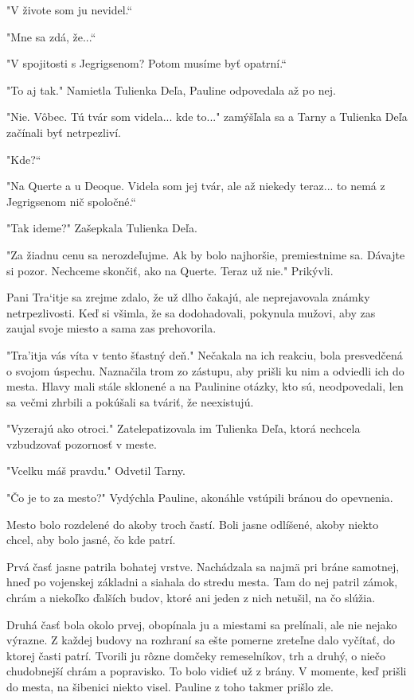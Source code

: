 \documentclass{book}
\begin{document}
"$ $V živote som ju nevidel.“

"$ $Mne sa zdá, že...“

"$ $V spojitosti s Jegrigsenom? Potom musíme byť opatrní.“

"$ $To aj tak."$ $ Namietla Tulienka Deľa, Pauline odpovedala až po nej.

"$ $Nie. Vôbec. Tú tvár som videla... kde to..."$ $ zamýšľala sa a Tarny a Tulienka Deľa začínali byť netrpezliví.

"$ $Kde?“

"$ $Na Querte a u Deoque. Videla som jej tvár, ale až niekedy teraz... to nemá z Jegrigsenom nič spoločné.“

"$ $Tak ideme?"$ $ Zašepkala Tulienka Deľa. 

"$ $Za žiadnu cenu sa nerozdeľujme. Ak by bolo najhoršie, premiestnime sa. Dávajte si pozor. Nechceme skončiť, ako na Querte. Teraz už nie."$ $ Prikývli.

Pani Tra‘itje sa zrejme zdalo, že už dlho čakajú, ale neprejavovala známky netrpezlivosti. Keď si všimla, že sa dodohadovali, pokynula mužovi, aby zas zaujal svoje miesto a sama zas prehovorila.

"$ $Tra'itja vás víta v tento šťastný deň."$ $ Nečakala na ich reakciu, bola presvedčená o svojom úspechu. Naznačila trom zo zástupu, aby prišli ku nim a odviedli ich do mesta. Hlavy mali stále sklonené a na Paulinine otázky, kto sú, neodpovedali, len sa večmi zhrbili a pokúšali sa tváriť, že neexistujú.

"$ $Vyzerajú ako otroci."$ $ Zatelepatizovala im Tulienka Deľa, ktorá nechcela vzbudzovať pozornosť v meste.

"$ $Vcelku máš pravdu."$ $ Odvetil Tarny.

"$ $Čo je to za mesto?"$ $ Vydýchla Pauline, akonáhle vstúpili bránou do opevnenia.

Mesto bolo rozdelené do akoby troch častí. Boli jasne odlíšené, akoby niekto chcel, aby bolo jasné, čo kde patrí.

Prvá časť jasne patrila bohatej vrstve. Nachádzala sa najmä pri bráne samotnej, hneď po vojenskej základni a siahala do stredu mesta. Tam do nej patril zámok, chrám a niekoľko ďalších budov, ktoré ani jeden z nich netušil, na čo slúžia.

Druhá časť bola okolo prvej, obopínala ju a miestami sa prelínali, ale nie nejako výrazne. Z každej budovy na rozhraní sa ešte pomerne zreteľne dalo vyčítať, do ktorej časti patrí. Tvorili ju rôzne domčeky remeselníkov, trh a druhý, o niečo chudobnejší chrám a popravisko. To bolo vidieť už z brány. V momente, keď prišli do mesta, na šibenici niekto visel. Pauline z toho takmer prišlo zle.
\end{document}
